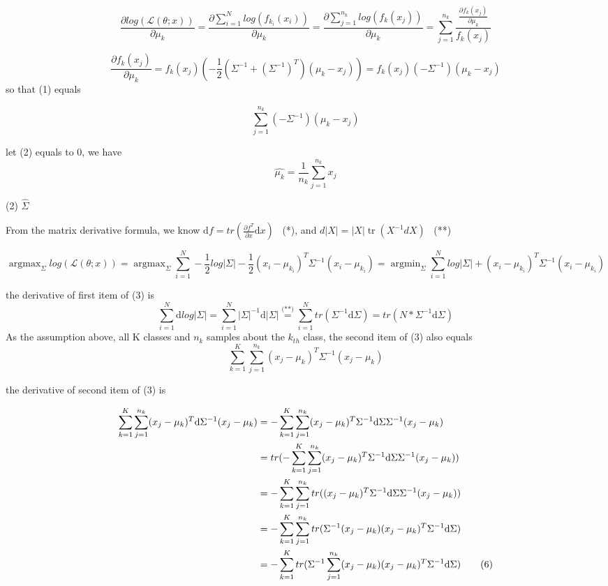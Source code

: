 \documentclass[10pt,a4paper]{article}
\begin{document}
\[
	\frac{\partial log(\mathcal{L}(\theta;x))}{\partial \mu_{k}} = \frac{\partial \sum_{i=1}^{N}log(f_{k_{i}}(x_i))}{\partial \mu_{k}}=\frac{\partial \sum_{j=1}^{n_k}log(f_{k}(x_j))}{\partial \mu_{k}}=\sum_{j=1}^{n_k}\frac{\frac{\partial f_{k}(x_j)}{\partial \mu_{k}}}{f_{k}(x_j)} 
	\tag{1}
\]

$$ 
	\frac{\partial f_{k}(x_j)}{\partial \mu_{k}} = f_k(x_j) (-\frac{1}{2}(\Sigma^{-1}+(\Sigma^{-1})^T)(\mu_{k}-x_j)) = f_k(x_j) (-\Sigma^{-1})(\mu_{k}-x_j)
$$
so that (1) equals

\[ 
\sum_{j=1}^{n_k}(-\Sigma^{-1})(\mu_{k}-x_j)
\tag{2}
\]

let (2) equals to 0, we have
\[ 
\hat{\mu_{k}}=\frac{1}{n_{k}}\sum_{j=1}^{n_k}x_j
\]


(2) $\hat{\Sigma}$

From the matrix derivative formula, we know $\mathrm{d}f=tr(\frac{\partial f^T}{\partial x} \mathrm{d} x) $ \  (*), and $d|X|=|X| \operatorname{tr}\left(X^{-1} d X\right)$ \  (**)

\[ \mathop{\arg\max}_{\Sigma}log(\mathcal{L}(\theta;x)) = \mathop{\arg\max}_{\Sigma} \sum_{i=1}^{N}-\frac{1}{2}log|\Sigma|-\frac{1}{2}(x_i-\mu_{k_i})^T\Sigma^{-1}(x_i-\mu_{k_i})= \mathop{\arg\min}_{\Sigma} \sum_{i=1}^{N}log|\Sigma|+(x_i-\mu_{k_i})^T\Sigma^{-1}(x_i-\mu_{k_i}) \tag{3}\]

the derivative of first item of (3) is
\[ 
\sum_{i=1}^{N}\mathrm{d}log|\Sigma|=\sum_{i=1}^{N}|\Sigma|^{-1}\mathrm{d}|\Sigma|\overset{\text{(**)}}{=}\sum_{i=1}^{N}tr(\Sigma^{-1}\mathrm{d}\Sigma)=tr(N*\Sigma^{-1}\mathrm{d}\Sigma)
\tag{4}
 \]
As the assumption above, all K classes and $n_k$ samples about the $k_{th}$ class, the second item of (3) also equals
\[ 
\sum_{k=1}^{K}\sum_{j=1}^{n_k}(x_j-\mu_{k})^T\Sigma^{-1}(x_j-\mu_{k})
\tag{5}
\]

 
the derivative of second item of (3) is


\begin{align}
	\sum_{k=1}^{K}\sum_{j=1}^{n_k}(x_j-\mu_{k})^T\mathrm{d}\Sigma^{-1}(x_j-\mu_{k}) 
	& = -\sum_{k=1}^{K}\sum_{j=1}^{n_k}(x_j-\mu_{k})^T\Sigma^{-1}\mathrm{d}\Sigma\Sigma^{-1}(x_j-\mu_{k}) \notag \\
	& = tr(-\sum_{k=1}^{K}\sum_{j=1}^{n_k}(x_j-\mu_{k})^T\Sigma^{-1}\mathrm{d}\Sigma\Sigma^{-1}(x_j-\mu_{k})) \notag \\
	& = -\sum_{k=1}^{K}\sum_{j=1}^{n_k}tr((x_j-\mu_{k})^T\Sigma^{-1}\mathrm{d}\Sigma\Sigma^{-1}(x_j-\mu_{k}))	\notag \\
	& = -\sum_{k=1}^{K}\sum_{j=1}^{n_k}tr(\Sigma^{-1}(x_j-\mu_{k})(x_j-\mu_{k})^T\Sigma^{-1}\mathrm{d}\Sigma)	\notag \\
	& = -\sum_{k=1}^{K}tr(\Sigma^{-1}\sum_{j=1}^{n_k}(x_j-\mu_{k})(x_j-\mu_{k})^T\Sigma^{-1}\mathrm{d}\Sigma)	\tag{6}
\end{align}
\end{document}
